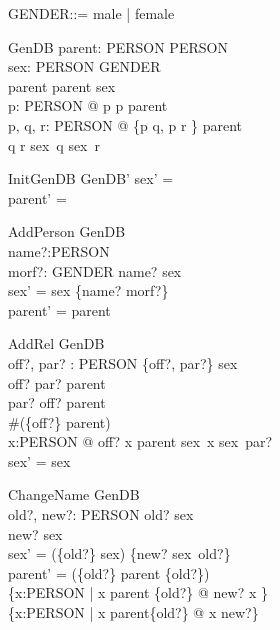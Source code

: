\documentclass{article}
\begin{document}
\begin{zed}
[PERSON]
\end{zed}

\begin{zed}
GENDER::= male | female
\end{zed}

\begin{schema}{GenDB}
parent: PERSON \rel PERSON \\
sex: PERSON \pfun GENDER \\
\where
\dom parent \cup \ran parent \subseteq \dom sex \\
\forall p: PERSON @ p \mapsto p \notin parent\plus \\
\forall p, q, r: PERSON @ \{p \mapsto q, p \mapsto r \} \subseteq parent \\
\land q \neq r \implies sex~q \neq sex~r 
\end{schema}

\begin{schema}{InitGenDB}
  GenDB'
\where
  sex' = \emptyset \\
  parent' =  \emptyset
\end{schema}

\begin{schema}{AddPerson}
\Delta GenDB \\
name?:PERSON \\
morf?: GENDER
\where
name? \notin \dom sex \\
sex' = sex \cup \{name? \mapsto morf?\} \\
parent' = parent
\end{schema}

\begin{schema}{AddRel}
  \Delta GenDB \\
  off?, par? : PERSON
\where
  \{off?, par?\} \subseteq \dom sex \\
  off? \mapsto par? \notin parent \\
  par? \mapsto off? \notin parent \\
  \#(\{off?\} \dres parent)  \\
  \forall x:PERSON @ off? \mapsto x \in parent \implies sex~x \neq sex~par? \\
  sex' = sex
\end{schema}

\begin{schema}{ChangeName}
\Delta GenDB \\
old?, new?: PERSON
\where
old? \in \dom sex \\
new? \notin \dom sex \\
sex' = (\{old?\} \ndres sex) \cup \{new? \mapsto sex~old?\} \\
parent' = (\{old?\} \ndres parent \nrres \{old?\}) \\
\cup \{x:PERSON | x \in parent \limg\{old?\} \rimg @ new? \mapsto x \} \\
\cup \{x:PERSON | x \notin parent\inv \limg \{old?\} \rimg @ x \mapsto new?\}
\end{schema}
\end{document}
